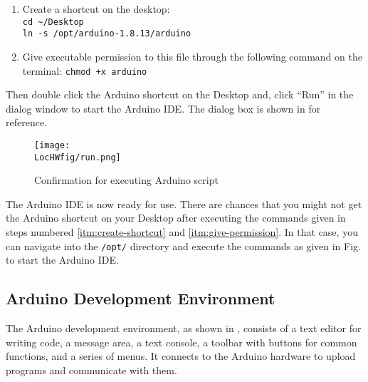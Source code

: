 \begin{enumerate}
      \item \label{itm:create-shortcut} Create a shortcut on the desktop:\\
            {\tt cd {\large \textasciitilde}/Desktop\\
            ln -s /opt/arduino-1.8.13/arduino}
      \item \label{itm:give-permission} Give executable permission to this file through the following
            command on the terminal: {\tt chmod +x arduino}
            
\end{enumerate}
Then double click the Arduino shortcut on the Desktop and, click ``Run''
in the dialog window to start the Arduino IDE. The dialog box is shown in  for reference.
\begin{figure}
      \centering
      \texttt{[image: \\LocHWfig/run.png]}
      \caption{Confirmation for executing Arduino script}
      \label{ard-lin-run}
\end{figure}
The Arduino IDE is now ready for use. There are chances that you might not 
get the Arduino shortcut on your Desktop after executing the commands given in 
steps numbered \ref{itm:create-shortcut} and \ref{itm:give-permission}. 
In that case, you can navigate into the {\tt /opt/} directory and execute the 
commands as given in Fig. to start the Arduino IDE. 


\subsection{Arduino Development Environment}
\label{sec:Arduino-IDE}
The Arduino development environment, as shown in ,
consists of 
a text editor for writing code, a message area, a text console, a
toolbar with buttons for common functions, and a series of menus. It
connects to the Arduino hardware to upload programs and communicate
with them.

